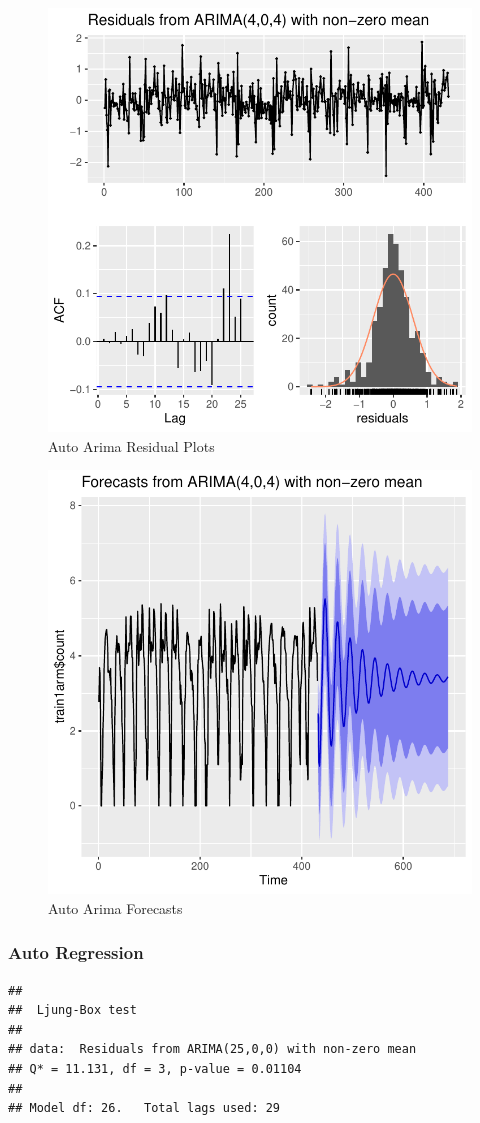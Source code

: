 \documentclass[american,]{article}
\begin{document}
\begin{figure}[htbp]

{\centering \includegraphics[width=0.45\linewidth]{BikeSharingDemand_files/figure-latex/auto-arima-plot-1-1} 

}

\caption{Auto Arima Residual Plots}\label{fig:auto-arima-plot-1}
\end{figure}

\begin{figure}[htbp]

{\centering \includegraphics[width=0.45\linewidth]{BikeSharingDemand_files/figure-latex/auto-arima-plot-2-1} 

}

\caption{Auto Arima Forecasts}\label{fig:auto-arima-plot-2}
\end{figure}

\newpage

\hypertarget{auto-regression}{%
\subsubsection{Auto Regression}\label{auto-regression}}

\begin{verbatim}
## 
##  Ljung-Box test
## 
## data:  Residuals from ARIMA(25,0,0) with non-zero mean
## Q* = 11.131, df = 3, p-value = 0.01104
## 
## Model df: 26.   Total lags used: 29
\end{verbatim}
\end{document}
